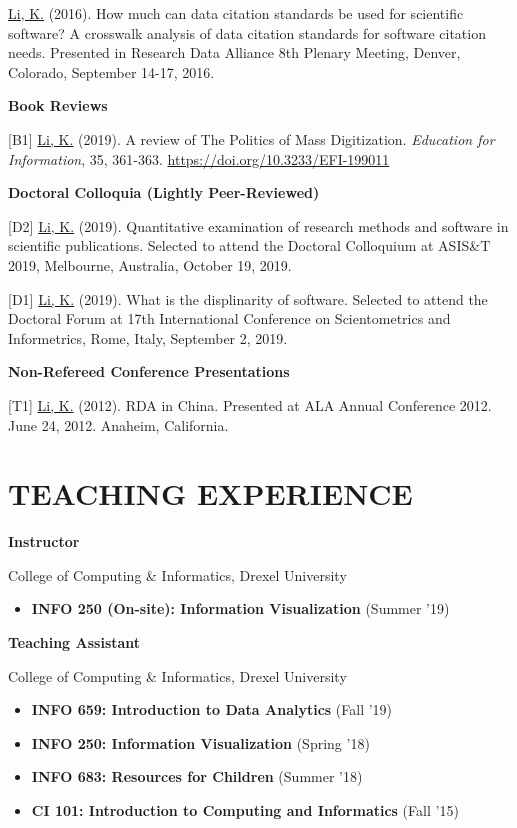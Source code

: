 \documentclass[margin, 10pt]{res} %
\begin{document}
\begin{resume}
[P1] \underline{Li, K.} (2016). How much can data citation standards be used for scientific software? A crosswalk analysis of data citation standards for software citation needs. Presented in Research Data Alliance 8th Plenary Meeting, Denver, Colorado, September 14-17, 2016.

\textbf{Book Reviews}

[B1] \underline{Li, K.} (2019). A review of The Politics of Mass Digitization. \textit{Education for Information}, 35, 361-363. \href{https://doi.org/10.3233/EFI-199011}{https://doi.org/10.3233/EFI-199011}

\textbf{Doctoral Colloquia (Lightly Peer-Reviewed)}

[D2] \underline{Li, K.} (2019). Quantitative examination of research methods and software in scientific publications. Selected to attend the Doctoral Colloquium at ASIS\&T 2019, Melbourne, Australia, October 19, 2019.

[D1] \underline{Li, K.} (2019). What is the displinarity of software. Selected to attend the Doctoral Forum at 17th International Conference on Scientometrics and Informetrics, Rome, Italy, September 2, 2019.

\textbf{Non-Refereed Conference Presentations}

[T1] \underline{Li, K.} (2012). RDA in China. Presented at ALA Annual Conference 2012. June 24, 2012. Anaheim, California.

\section{TEACHING EXPERIENCE}

\textbf{Instructor}

College of Computing \& Informatics, Drexel University

\begin{itemize}
\item \textbf{INFO 250 (On-site): Information Visualization} (Summer '19)
\end{itemize}

\textbf{Teaching Assistant}

College of Computing \& Informatics, Drexel University

\begin{itemize}
\item \textbf{INFO 659: Introduction to Data Analytics} (Fall '19)
\item \textbf{INFO 250: Information Visualization} (Spring '18)
\item \textbf{INFO 683: Resources for Children} (Summer '18)
\item \textbf{CI 101: Introduction to Computing and Informatics} (Fall '15)
\end{itemize}


\end{resume}
\end{document}
